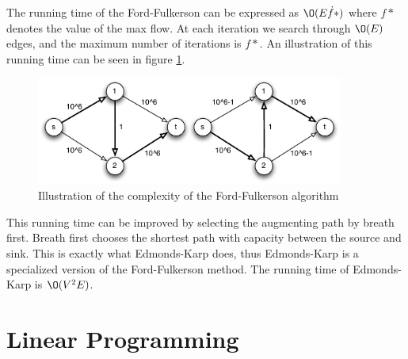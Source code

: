 \documentclass[10pt]{article}
\begin{document}
The running time of the Ford-Fulkerson can be expressed as $\O(E\dot f*)$ where $f*$ denotes the value of the max flow. At each iteration we search through $\O(E)$ edges, and the maximum number of iterations is $f*$. An illustration of this running time can be seen in figure \ref{fig2}.

\begin{figure}[ht]
\centering
\includegraphics[width=0.9\textwidth]{figures/fig2.pdf}
\caption{Illustration of the complexity of the Ford-Fulkerson algorithm}
\label{fig2}
\end{figure}

This running time can be improved by selecting the augmenting path by breath first. Breath first chooses the shortest path with capacity between the source and sink. This is exactly what Edmonds-Karp does, thus Edmonds-Karp is a specialized version of the Ford-Fulkerson method. The running time of Edmonds-Karp is $\O(V^2E)$.



\clearpage \newpage
\section{Linear Programming} %
\label{sec:linear_programming}
\end{document}
